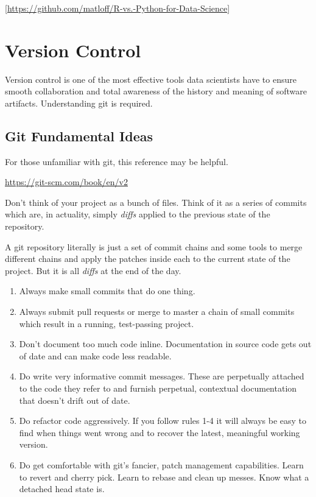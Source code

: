\documentclass[
  11pt,
]{book}
\providecommand{\tightlist}{%
  \setlength{\itemsep}{0pt}\setlength{\parskip}{0pt}}
\begin{document}
{[}\url{https://github.com/matloff/R-vs.-Python-for-Data-Science}{]}

\hypertarget{version-control}{%
\chapter{Version Control}\label{version-control}}

Version control is one of the most effective tools data scientists have to ensure smooth collaboration and total awareness of the history and meaning of software artifacts. Understanding git is required.

\hypertarget{git-fundamental-ideas}{%
\section{Git Fundamental Ideas}\label{git-fundamental-ideas}}

For those unfamiliar with git, this reference may be helpful.

\url{https://git-scm.com/book/en/v2}

Don't think of your project as a bunch of files. Think of it as a series of commits which are, in actuality, simply \emph{diffs} applied to the previous state of the repository.

A git repository literally is just a set of commit chains and some tools to merge different chains and apply the patches inside each to the current state of the project. But it is all \emph{diffs} at the end of the day.

\begin{enumerate}
\def\labelenumi{\arabic{enumi}.}
\tightlist
\item
  Always make small commits that do one thing.
\item
  Always submit pull requests or merge to master a chain of small commits which result in a running, test-passing project.
\item
  Don't document too much code inline. Documentation in source code gets out of date and can make code less readable.
\item
  Do write very informative commit messages. These are perpetually attached to the code they refer to and furnish perpetual, contextual documentation that doesn't drift out of date.
\item
  Do refactor code aggressively. If you follow rules 1-4 it will always be easy to find when things went wrong and to recover the latest, meaningful working version.
\item
  Do get comfortable with git's fancier, patch management capabilities. Learn to revert and cherry pick. Learn to rebase and clean up messes. Know what a detached head state is.
\end{enumerate}
\end{document}

